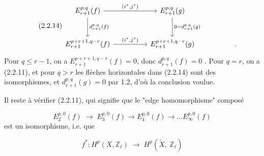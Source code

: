 \begin{equation}\tag{2.2.14}
\begin{tikzcd}[column sep=huge, row sep=large]
E_{r+1}^{p,q}(f) \arrow[r, "{(i^*,j^*)}"] \arrow[d, "{d_{r+1}^{p,q}(f)}"] & E_{r+1}^{p,q}(g) \arrow[d, "{0 = d_{r+1}^{p,q}(g)}"] \\
E_{r+1}^{p+r+1,q-r}(f) \arrow[r, "{(i^*,j^*)}"] & E_{r+1}^{p+r+1,q-r}(g) & .
\end{tikzcd}
\end{equation}
Pour $q \leq r-1$, on a $E_{r+1}^{p+r+1,q-r}(f) = 0$, donc $d_{r+1}^{p,q}(f) = 0$ . Pour $q = r$, on a (2.2.11), et pour $q > r$ les flèches horizontales dans (2.2.14) sont des isomorphismes, et $d_{r+1}^{p,q}(g)= 0$ par 1.2, d'où la conclusion voulue.

Il reste à vérifier (2.2.11), qui signifie que le "edge homomorphisme" composé

\begin{equation}\tag{2.2.15}
E_2^{p,0}(f) \;\longrightarrow\; E_3^{p,0}(f) \longrightarrow E_4^{p,0}(f) \longrightarrow \ldots E_\infty^{p,0}(f)
\end{equation}
est un isomorphisme, i.e. que

\begin{equation}\tag{2.2.16}
f^* : H^p(X,\mathbb{Z}_\ell) \;\longrightarrow\; H^p(\widetilde{X},\ \mathbb{Z}_\ell) 
\end{equation}

